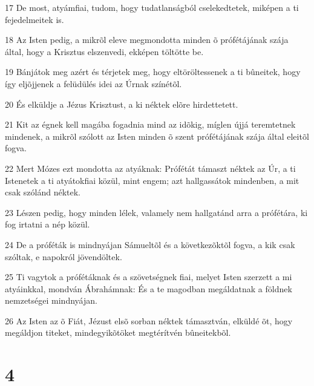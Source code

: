 \par 17 De most, atyámfiai, tudom, hogy tudatlanságból cselekedtetek, miképen a ti fejedelmeitek is.
\par 18 Az Isten pedig, a mikrõl eleve megmondotta minden õ prófétájának szája által, hogy a Krisztus elszenvedi, ekképen töltötte be.
\par 19 Bánjátok meg azért és térjetek meg, hogy eltöröltessenek a ti bûneitek, hogy így eljõjjenek a felüdülés  idei az Úrnak színétõl.
\par 20 És elküldje a Jézus Krisztust, a ki néktek elõre hirdettetett.
\par 21 Kit az égnek kell magába fogadnia mind az idõkig, míglen újjá teremtetnek mindenek, a mikrõl szólott az Isten minden õ szent prófétájának szája által eleitõl fogva.
\par 22 Mert Mózes ezt mondotta az atyáknak: Prófétát támaszt néktek az Úr, a ti Istenetek a ti atyátokfiai közül, mint engem; azt hallgassátok mindenben, a mit csak szólánd néktek.
\par 23 Lészen pedig, hogy minden lélek, valamely nem hallgatánd arra a prófétára, ki fog irtatni a nép közül.
\par 24 De a próféták is mindnyájan Sámueltõl és a következõktõl fogva, a kik csak szóltak, e napokról jövendöltek.
\par 25 Ti vagytok a prófétáknak és a szövetségnek fiai, melyet Isten szerzett a mi atyáinkkal, mondván Ábrahámnak: És a te magodban megáldatnak a földnek nemzetségei mindnyájan.
\par 26 Az Isten az õ Fiát, Jézust elsõ sorban néktek támasztván, elküldé õt, hogy megáldjon  titeket, mindegyikõtöket megtérítvén bûneitekbõl.

\chapter{4}

